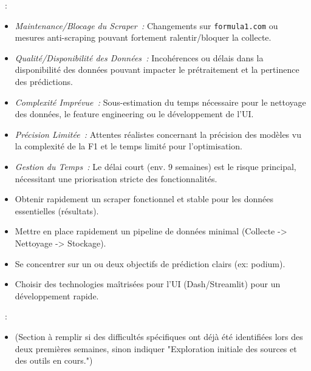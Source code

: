 \documentclass[11pt, a4paper]{article}
\newcommand{\currentReportDate}{23 Avril 2025} %
\begin{document}
\begin{description}[style=standard, itemsep=0.5em, labelwidth=!, leftmargin=1.5em, font=\normalfont]
    \item[Risques Identifiés (principaux pour un projet court)]~:
        \begin{itemize}[label=\textbullet, itemsep=0.2em, leftmargin=*]
            \item \textit{Maintenance/Blocage du Scraper~:} Changements sur \texttt{formula1.com} ou mesures anti-scraping pouvant fortement ralentir/bloquer la collecte.
            \item \textit{Qualité/Disponibilité des Données~:} Incohérences ou délais dans la disponibilité des données pouvant impacter le prétraitement et la pertinence des prédictions.
            \item \textit{Complexité Imprévue~:} Sous-estimation du temps nécessaire pour le nettoyage des données, le feature engineering ou le développement de l'UI.
            \item \textit{Précision Limitée~:} Attentes réalistes concernant la précision des modèles vu la complexité de la F1 et le temps limité pour l'optimisation.
            \item \textit{Gestion du Temps~:} Le délai court (env. 9 semaines) est le risque principal, nécessitant une priorisation stricte des fonctionnalités.
        \end{itemize}
    \item[Points Critiques pour le Succès~:]
        \begin{itemize}[label=\textbullet, itemsep=0.2em, leftmargin=*]
            \item Obtenir rapidement un scraper fonctionnel et stable pour les données essentielles (résultats).
            \item Mettre en place rapidement un pipeline de données minimal (Collecte -> Nettoyage -> Stockage).
            \item Se concentrer sur un ou deux objectifs de prédiction clairs (ex: podium).
            \item Choisir des technologies maîtrisées pour l'UI (Dash/Streamlit) pour un développement rapide.
        \end{itemize}
    \item[Problèmes Rencontrés à ce Stade (\currentReportDate)]~:
        \begin{itemize}[label=\textbullet, itemsep=0.2em, leftmargin=*]
            \item (Section à remplir si des difficultés spécifiques ont déjà été identifiées lors des deux premières semaines, sinon indiquer "Exploration initiale des sources et des outils en cours.")
        \end{itemize}
\end{description}
\end{document}
